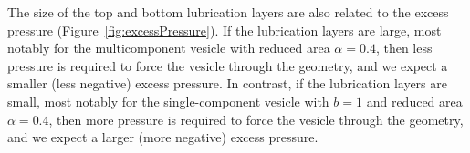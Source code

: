 \documentclass[twoside,twocolumn,9pt]{article}
\newcommand{\subfigimg}[3][,]{%
  \setbox1=\hbox{\texttt{[image: \#3]}}%
  \leavevmode\rlap{\usebox1}%
  \rlap{\hspace*{0pt}\raisebox{\dimexpr\ht1-0\baselineskip}{\bf
  \normalsize #2}}%
  \phantom{\usebox1}%
}
\begin{document}

The size of the top and bottom lubrication layers are also related to the excess pressure (Figure~\ref{fig:excessPressure}). If the lubrication layers are large, most notably for the multicomponent vesicle with reduced area $\alpha = 0.4$, then less pressure is required to force the vesicle through the geometry, and we expect a smaller (less negative) excess pressure. In contrast, if the lubrication layers are small, most notably for the single-component vesicle with $b=1$ and reduced area $\alpha = 0.4$, then more pressure is required to force the vesicle through the geometry, and we expect a larger (more negative) excess pressure.
\end{document}
